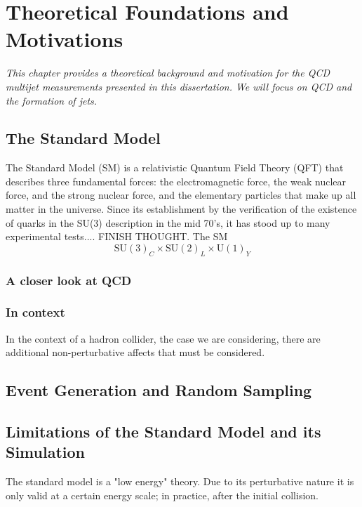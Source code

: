 \chapter{Theoretical Foundations and Motivations}\label{chap:theory}
\textit{This chapter provides a theoretical background and motivation for the QCD multijet measurements presented in this dissertation. We will focus on QCD and the formation of jets.}
\section{The Standard Model}\label{sec1:ch1:theory}
The Standard Model (SM) is a relativistic Quantum Field Theory (QFT) that describes three fundamental forces: the electromagnetic force, the weak nuclear force, and the strong nuclear force, and the elementary particles that make up all matter in the universe. Since its establishment by the verification of the existence of quarks in the SU(3) description in the mid 70's, it has stood up to many experimental tests.... FINISH THOUGHT.
The SM 
\begin{equation}
\text{SU}(3)_C \times \text{SU}(2)_L \times \text{U}(1)_Y
\end{equation}
\subsection{A closer look at QCD}\label{sec1.1:ch1:QCD}
\subsection{In context}
In the context of a hadron collider, the case we are considering, there are additional non-perturbative affects that must be considered.
\section{Event Generation and Random Sampling}\label{sec2:ch1:theory}
\subsection{}
\section{Limitations of the Standard Model and its Simulation}\label{sec3:ch1:theory}
The standard model is a "low energy" theory. Due to its perturbative nature it is only valid at a certain energy scale; in practice, after the initial collision. 
